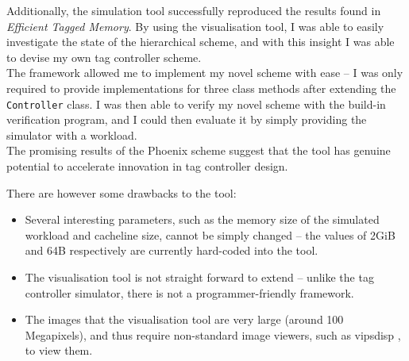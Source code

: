 Additionally, the simulation tool successfully reproduced the results found in \textit{Efficient
Tagged Memory}. By using the visualisation tool, I was able to easily
investigate the state of the hierarchical scheme, and with this insight I was
able to devise my own tag controller scheme.\\
The framework allowed me to implement my novel scheme with ease -- I was only
required to provide implementations for three class methods after extending the
\texttt{Controller} class. I was then able to verify my novel scheme with the
build-in verification program, and I could then evaluate it by simply providing
the simulator with a workload.\\
The promising results of the Phoenix scheme suggest that the tool has genuine
potential to accelerate innovation in tag controller design.

There are however some drawbacks to the tool:
\begin{itemize}
	\item Several interesting parameters, such as the memory size of the simulated workload and cacheline size, cannot be simply changed -- the values of 2GiB and 64B respectively are currently hard-coded into the tool.
	\item The visualisation tool is not straight forward to extend -- unlike
	the tag controller simulator, there is not a programmer-friendly framework.
	\item The images that the visualisation tool are very large (around 100
	Megapixels), and thus require non-standard image viewers, such as
	vipsdisp \cite{vipsdisp}, to view them.
\end{itemize}



